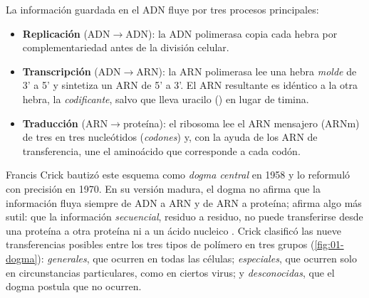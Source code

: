 La información guardada en el ADN fluye por tres procesos principales:

\begin{itemize}
  \item \textbf{Replicación} (ADN$\to$ADN): la ADN polimerasa copia cada hebra por complementariedad antes de la división celular.
  \item \textbf{Transcripción} (ADN$\to$ARN): la ARN polimerasa lee una hebra \emph{molde} de 3' a 5' y sintetiza un ARN de 5' a 3'. El ARN resultante es idéntico a la otra hebra, la \emph{codificante}, salvo que lleva uracilo () en lugar de timina.
  \item \textbf{Traducción} (ARN$\to$proteína): el ribosoma lee el ARN mensajero (ARNm) de tres en tres nucleótidos (\emph{codones}) y, con la ayuda de los ARN de transferencia, une el aminoácido que corresponde a cada codón.
\end{itemize}

Francis Crick bautizó este esquema como \emph{dogma central} en 1958 y lo reformuló con precisión en 1970. En su versión madura, el dogma no afirma que la información fluya siempre de ADN a ARN y de ARN a proteína; afirma algo más sutil: que la información \emph{secuencial}, residuo a residuo, no puede transferirse desde una proteína a otra proteína ni a un ácido nucleico \parencite{c01-crick1970}. Crick clasificó las nueve transferencias posibles entre los tres tipos de polímero en tres grupos (\cref{fig:01-dogma}): \emph{generales}, que ocurren en todas las células; \emph{especiales}, que ocurren solo en circunstancias particulares, como en ciertos virus; y \emph{desconocidas}, que el dogma postula que no ocurren.

